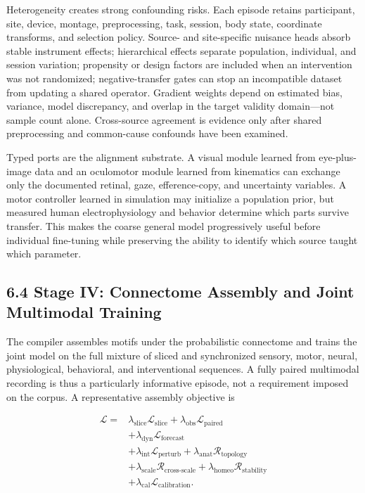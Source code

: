Heterogeneity creates strong confounding risks. Each episode retains
participant, site, device, montage, preprocessing, task, session, body state,
coordinate transforms, and selection policy. Source- and site-specific
nuisance heads absorb stable instrument effects; hierarchical effects separate
population, individual, and session variation; propensity or design factors
are included when an intervention was not randomized; negative-transfer gates
can stop an incompatible dataset from updating a shared operator. Gradient
weights depend on estimated bias, variance, model discrepancy, and overlap in
the target validity domain---not sample count alone. Cross-source agreement is
evidence only after shared preprocessing and common-cause confounds have been
examined.

Typed ports are the alignment substrate. A visual module learned from
eye-plus-image data and an oculomotor module learned from kinematics can
exchange only the documented retinal, gaze, efference-copy, and uncertainty
variables. A motor controller learned in simulation may initialize a
population prior, but measured human electrophysiology and behavior determine
which parts survive transfer. This makes the coarse general model
progressively useful before individual fine-tuning while preserving the
ability to identify which source taught which parameter.

\subsection{6.4 Stage IV: Connectome Assembly and Joint Multimodal Training}

The compiler assembles motifs under the probabilistic connectome and trains
the joint model on the full mixture of sliced and synchronized sensory, motor,
neural, physiological, behavioral, and interventional sequences. A fully
paired multimodal recording is thus a particularly informative episode, not a
requirement imposed on the corpus. A representative assembly objective is

\[
\begin{aligned}
\mathcal{L}={}&
\lambda_{\mathrm{slice}}\mathcal{L}_{\mathrm{slice}}
+\lambda_{\mathrm{obs}}\mathcal{L}_{\mathrm{paired}}\\
&+\lambda_{\mathrm{dyn}}\mathcal{L}_{\mathrm{forecast}}\\
&+\lambda_{\mathrm{int}}\mathcal{L}_{\mathrm{perturb}}
+\lambda_{\mathrm{anat}}\mathcal{R}_{\mathrm{topology}}\\
&+\lambda_{\mathrm{scale}}\mathcal{R}_{\mathrm{cross\mbox{-}scale}}
+\lambda_{\mathrm{homeo}}\mathcal{R}_{\mathrm{stability}}\\
&+\lambda_{\mathrm{cal}}\mathcal{L}_{\mathrm{calibration}} .
\end{aligned}
\]

